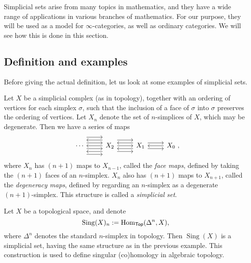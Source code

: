Simplicial sets arise from many topics in mathematics,
and they have a wide range of applications in various branches of mathematics.
For our purpose, they will be used as a model for $\infty$-categories,
as well as ordinary categories.
We will see how this is done in this section.

\subsection{Definition and examples}

Before giving the actual definition,
let us look at some examples of simplicial sets.

\begin{example}
    Let $X$ be a simplicial complex (as in topology),
    together with an ordering of vertices for each simplex $\sigma$,
    such that the inclusion of a face of $\sigma$ into $\sigma$
    preserves the ordering of vertices.
    Let $X_n$ denote the set of $n$-simplices of $X$, which may be degenerate.
    Then we have a series of maps
    \[\begin{tikzcd}
        \cdots\ar[r,shift left=3ex]\ar[r,shift left=1ex]\ar[r,shift right=1ex]\ar[r,shift right=3ex] &
        X_2\ar[l,shift left=2ex]\ar[l]\ar[l,shift right=2ex]\ar[r,shift left=2ex]\ar[r]\ar[r,shift right=2ex] &
        X_1\ar[l,shift left=1ex]\ar[l,shift right=1ex]\ar[r,shift left=1ex]\ar[r,shift right=1ex] &
        X_0\rlap{\ ,}\ar[l]
    \end{tikzcd}\]
    where $X_n$ has $(n+1)$ maps to $X_{n-1}$, called the \emph{face maps},
    defined by taking the $(n+1)$ faces of an $n$-simplex.
    $X_n$ also has $(n+1)$ maps to $X_{n+1}$, called the \emph{degeneracy maps},
    defined by regarding an $n$-simplex as a degenerate $(n+1)$-simplex.
    This structure is called a \emph{simplicial set}. \varqed
\end{example}

\begin{example}
    Let $X$ be a topological space, and denote
    \[\operatorname{Sing}(X)_n:=\operatorname{Hom}_{\mathsf{Top}}(\Delta^n,X),\]
    where $\Delta^n$ denotes the standard $n$-simplex in topology.
    Then $\operatorname{Sing}(X)$ is a simplicial set,
    having the same structure as in the previous example.
    This construction is used to define singular (co)homology in algebraic topology. \varqed
\end{example}

